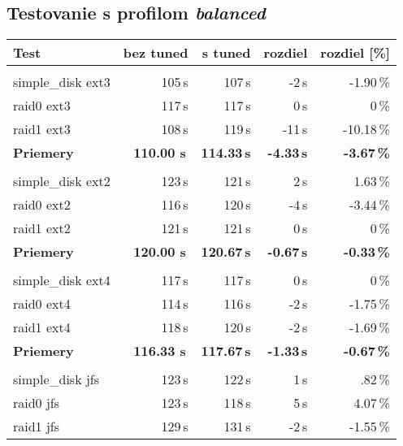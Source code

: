%
%
\subsection{Testovanie s profilom \emph{balanced}}

\begin{table}[H]
\begin{center}
\begin{tabular}{|l|r r r r|}
    \hline
    \textbf{Test} & \textbf{bez tuned} & \textbf{s tuned} & \textbf{rozdiel} & \textbf{rozdiel [\%]} \\
    \hline & \\[-1em]\hline
    simple\_disk ext3 & 105\,s & 107\,s & -2\,s & -1.90\,\% \\
    raid0 ext3 & 117\,s & 117\,s & 0\,s & 0\,\% \\
    raid1 ext3 & 108\,s & 119\,s & -11\,s & -10.18\,\% \\
    \hline
    \textbf{Priemery} & \textbf{110.00 s}\,& \textbf{114.33\,s} & \textbf{-4.33\,s} & \textbf{-3.67\,\%} \\
    \hline & \\[-1em]\hline
    simple\_disk ext2 & 123\,s & 121\,s & 2\,s & 1.63\,\% \\
    raid0 ext2 & 116\,s & 120\,s & -4\,s & -3.44\,\% \\
    raid1 ext2 & 121\,s & 121\,s & 0\,s & 0\,\% \\
    \hline
    \textbf{Priemery} & \textbf{120.00 s}\,& \textbf{120.67\,s} & \textbf{-0.67\,s} & \textbf{-0.33\,\%} \\
    \hline & \\[-1em]\hline
    simple\_disk ext4 & 117\,s & 117\,s & 0\,s & 0\,\% \\
    raid0 ext4 & 114\,s & 116\,s & -2\,s & -1.75\,\% \\
    raid1 ext4 & 118\,s & 120\,s & -2\,s & -1.69\,\% \\
    \hline
    \textbf{Priemery} & \textbf{116.33 s}\,& \textbf{117.67\,s} & \textbf{-1.33\,s} & \textbf{-0.67\,\%} \\
    \hline & \\[-1em]\hline
    simple\_disk jfs & 123\,s & 122\,s & 1\,s & .82\,\% \\
    raid0 jfs & 123\,s & 118\,s & 5\,s & 4.07\,\% \\
    raid1 jfs & 129\,s & 131\,s & -2\,s & -1.55\,\% \\
    \hline

\end{tabular}
\end{center}
\end{table}
